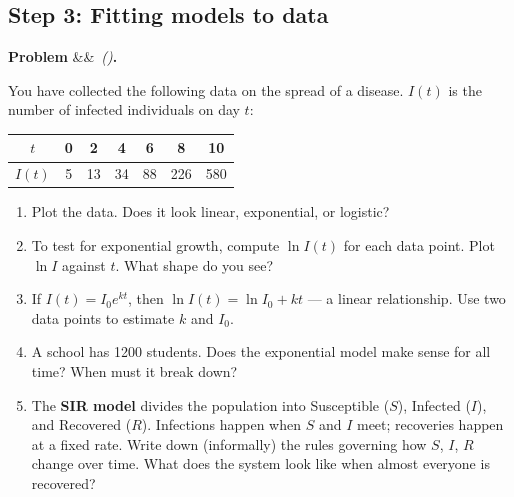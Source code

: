 \documentclass[12pt, a4paper]{article}
\newcounter{problem}
\newenvironment{problem}[1][]{%
  \refstepcounter{problem}%
  \par\vspace{6pt}%
  \noindent\textbf{\color{MidBlue}Problem \theproblem}%
  \ifx&#1&\else\ \textit{(#1)}\fi\textbf{.}\enskip
}{\par\vspace{4pt}}
\begin{document}
\subsection{Step 3: Fitting models to data}

\begin{problem}
\label{prob:fitting}
You have collected the following data on the spread of a disease. $I(t)$ is the number of infected individuals on day $t$:

\begin{center}
\begin{tabular}{ccccccc}
\toprule
$t$ & 0 & 2 & 4 & 6 & 8 & 10 \\
\midrule
$I(t)$ & 5 & 13 & 34 & 88 & 226 & 580 \\
\bottomrule
\end{tabular}
\end{center}

\begin{enumerate}[label=(\alph*), topsep=2pt]
  \item Plot the data. Does it look linear, exponential, or logistic?
  \item To test for exponential growth, compute $\ln I(t)$ for each data point. Plot $\ln I$ against $t$. What shape do you see?
  \item If $I(t) = I_0 e^{kt}$, then $\ln I(t) = \ln I_0 + kt$ --- a linear relationship. Use two data points to estimate $k$ and $I_0$.
  \item A school has 1200 students. Does the exponential model make sense for all time? When must it break down?
  \item The \textbf{SIR model} divides the population into Susceptible ($S$), Infected ($I$), and Recovered ($R$). Infections happen when $S$ and $I$ meet; recoveries happen at a fixed rate. Write down (informally) the rules governing how $S$, $I$, $R$ change over time. What does the system look like when almost everyone is recovered?
\end{enumerate}
\end{problem}
\end{document}
